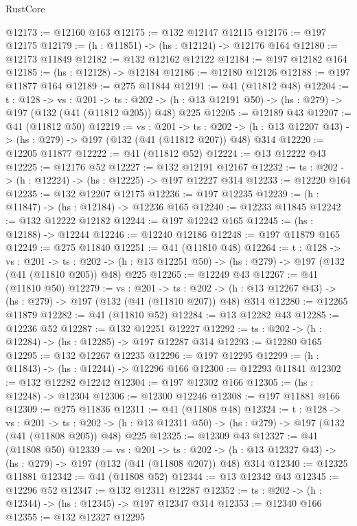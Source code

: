 \begin{lexlean}{RustCore}
\begin{coremodule}
@12173 := @12160 @163
@12175 := @132 @12147 @12115
@12176 := @197 @12175
@12179 := (h : @11851) -> (hs : @12124) -> @12176 @164
@12180 := @12173 @11849
@12182 := @132 @12162 @12122
@12184 := @197 @12182 @164
@12185 := (hs : @12128) -> @12184
@12186 := @12180 @12126
@12188 := @197 @11877 @164
@12189 := @275 @11844
@12191 := @41 (@11812 @48)
@12204 := {t : @128} ->
  {vs : @201} ->
  {ts : @202} -> (h : @13 @12191 @50) -> (hs : @279) -> @197 (@132 (@41 (@11812 @205)) @48) @225
@12205 := @12189 @43
@12207 := @41 (@11812 @50)
@12219 := {vs : @201} ->
  {ts : @202} -> (h : @13 @12207 @43) -> (hs : @279) -> @197 (@132 (@41 (@11812 @207)) @48) @314
@12220 := @12205 @11877
@12222 := @41 (@11812 @52)
@12224 := @13 @12222 @43
@12225 := @12176 @52
@12227 := @132 @12191 @12167
@12232 := {ts : @202} -> (h : @12224) -> (hs : @12225) -> @197 @12227 @314
@12233 := @12220 @164
@12235 := @132 @12207 @12175
@12236 := @197 @12235
@12239 := (h : @11847) -> (hs : @12184) -> @12236 @165
@12240 := @12233 @11845
@12242 := @132 @12222 @12182
@12244 := @197 @12242 @165
@12245 := (hs : @12188) -> @12244
@12246 := @12240 @12186
@12248 := @197 @11879 @165
@12249 := @275 @11840
@12251 := @41 (@11810 @48)
@12264 := {t : @128} ->
  {vs : @201} ->
  {ts : @202} -> (h : @13 @12251 @50) -> (hs : @279) -> @197 (@132 (@41 (@11810 @205)) @48) @225
@12265 := @12249 @43
@12267 := @41 (@11810 @50)
@12279 := {vs : @201} ->
  {ts : @202} -> (h : @13 @12267 @43) -> (hs : @279) -> @197 (@132 (@41 (@11810 @207)) @48) @314
@12280 := @12265 @11879
@12282 := @41 (@11810 @52)
@12284 := @13 @12282 @43
@12285 := @12236 @52
@12287 := @132 @12251 @12227
@12292 := {ts : @202} -> (h : @12284) -> (hs : @12285) -> @197 @12287 @314
@12293 := @12280 @165
@12295 := @132 @12267 @12235
@12296 := @197 @12295
@12299 := (h : @11843) -> (hs : @12244) -> @12296 @166
@12300 := @12293 @11841
@12302 := @132 @12282 @12242
@12304 := @197 @12302 @166
@12305 := (hs : @12248) -> @12304
@12306 := @12300 @12246
@12308 := @197 @11881 @166
@12309 := @275 @11836
@12311 := @41 (@11808 @48)
@12324 := {t : @128} ->
  {vs : @201} ->
  {ts : @202} -> (h : @13 @12311 @50) -> (hs : @279) -> @197 (@132 (@41 (@11808 @205)) @48) @225
@12325 := @12309 @43
@12327 := @41 (@11808 @50)
@12339 := {vs : @201} ->
  {ts : @202} -> (h : @13 @12327 @43) -> (hs : @279) -> @197 (@132 (@41 (@11808 @207)) @48) @314
@12340 := @12325 @11881
@12342 := @41 (@11808 @52)
@12344 := @13 @12342 @43
@12345 := @12296 @52
@12347 := @132 @12311 @12287
@12352 := {ts : @202} -> (h : @12344) -> (hs : @12345) -> @197 @12347 @314
@12353 := @12340 @166
@12355 := @132 @12327 @12295

\end{coremodule}
\end{lexlean}
